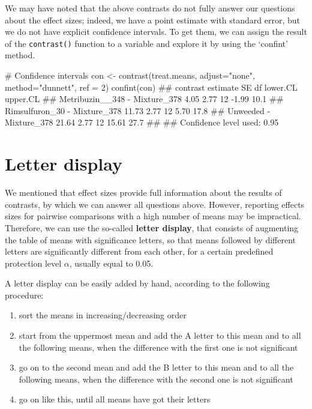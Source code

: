\documentclass[a4paper,12pt,oneside]{book}
\providecommand{\tightlist}{%
  \setlength{\itemsep}{0pt}\setlength{\parskip}{0pt}}
\newenvironment{Shaded}{\begin{snugshade}}{\end{snugshade}}
\newcommand{\DecValTok}[1]{#1}
\newcommand{\StringTok}[1]{#1}
\newcommand{\CommentTok}[1]{#1}
\newcommand{\DocumentationTok}[1]{#1}
\newcommand{\OtherTok}[1]{#1}
\newcommand{\FunctionTok}[1]{#1}
\newcommand{\AttributeTok}[1]{#1}
\newcommand{\NormalTok}[1]{#1}
\begin{document}
\normalsize

We may have noted that the above contrasts do not fully answer our questions about the effect sizes; indeed, we have a point estimate with standard error, but we do not have explicit confidence intervals. To get them, we can assign the result of the \texttt{contrast()} function to a variable and explore it by using the `confint' method.

\begin{Shaded}
\begin{Highlighting}[]
\CommentTok{\# Confidence intervals}
\NormalTok{con }\OtherTok{\textless{}{-}} \FunctionTok{contrast}\NormalTok{(treat.means, }\AttributeTok{adjust=}\StringTok{"none"}\NormalTok{, }
                \AttributeTok{method=}\StringTok{"dunnett"}\NormalTok{, }\AttributeTok{ref =} \DecValTok{2}\NormalTok{)}
\FunctionTok{confint}\NormalTok{(con)}
\DocumentationTok{\#\#  contrast                      estimate   SE df lower.CL upper.CL}
\DocumentationTok{\#\#  Metribuzin\_\_348 {-} Mixture\_378     4.05 2.77 12    {-}1.99     10.1}
\DocumentationTok{\#\#  Rimsulfuron\_30 {-} Mixture\_378     11.73 2.77 12     5.70     17.8}
\DocumentationTok{\#\#  Unweeded {-} Mixture\_378           21.64 2.77 12    15.61     27.7}
\DocumentationTok{\#\# }
\DocumentationTok{\#\# Confidence level used: 0.95}
\end{Highlighting}
\end{Shaded}

\hypertarget{letter-display}{%
\section{Letter display}\label{letter-display}}

We mentioned that effect sizes provide full information about the results of contrasts, by which we can answer all questions above. However, reporting effects sizes for pairwise comparisons with a high number of means may be impractical. Therefore, we can use the so-called \textbf{letter display}, that consists of augmenting the table of means with significance letters, so that means followed by different letters are significantly different from each other, for a certain predefined protection level \(\alpha\), usually equal to 0.05.

A letter display can be easily added by hand, according to the following procedure:

\begin{enumerate}
\def\labelenumi{\arabic{enumi}.}
\tightlist
\item
  sort the means in increasing/decreasing order
\item
  start from the uppermost mean and add the A letter to this mean and to all the following means, when the difference with the first one is not significant
\item
  go on to the second mean and add the B letter to this mean and to all the following means, when the difference with the second one is not significant
\item
  go on like this, until all means have got their letters
\end{enumerate}
\end{document}
